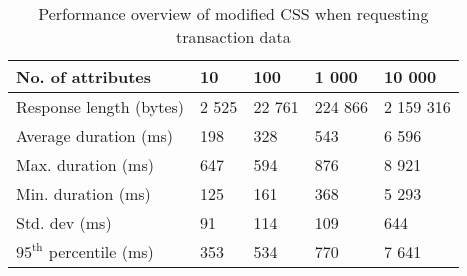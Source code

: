 \begin{table}[H]
\begin{subtable}{1.0\textwidth}
\centering
\begin{tabular}{lllll}
\textbf{No. of attributes} & \multicolumn{1}{l}{\textbf{10}} & \multicolumn{1}{l}{\textbf{100}} & \multicolumn{1}{l}{\textbf{1 000}} & \multicolumn{1}{l}{\textbf{10 000}} \\ \hline
Response length (bytes)    & 2 525                           & 22 761                           & 224 866                            & 2 159 316                           \\
Average duration (ms)      & 198                          & 328                           & 543                             & 6 596                            \\
Max. duration (ms)         & 647                             & 594                              & 876                                & 8 921                               \\
Min. duration (ms)         & 125                             & 161                              & 368                                & 5 293                               \\
Std. dev (ms)              & 91                           & 114                           & 109                             & 644                              \\
$95^{\text{th}}$ percentile (ms)       & 353                          & 534                           & 770                              & 7 641                            
\end{tabular}
\caption{Performance overview of modified \acrshort{CSS} when requesting transaction data}
\label{table:results-modified-json}
\end{subtable}

\vspace*{0.5 cm}


\end{table}
